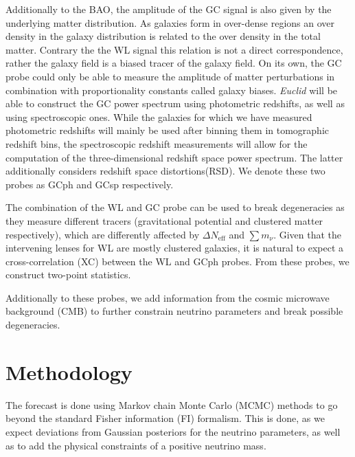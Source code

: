 \documentclass[a4paper,11pt]{article}
\newcommand{\euclid}{\textit{Euclid}\xspace}
\newcommand{\dneff}{\Delta N_\mathrm{eff}}
\newcommand{\summnu}{\sum m_\nu}
\begin{document}
Additionally to the BAO, the amplitude of the GC signal is also given by the underlying matter distribution. As galaxies form in over-dense regions an over density in the galaxy     distribution is related to the over density in the total matter. Contrary the the WL signal this relation is not a direct correspondence, rather the galaxy field is a biased tracer of the galaxy field. On its own, the GC probe could only be able to measure the amplitude of matter perturbations in combination with proportionality constants called galaxy biases. \euclid will be able to construct the GC power spectrum using photometric redshifts, as well as using spectroscopic ones. While the galaxies for which we have measured photometric redshifts will mainly be used after binning them in tomographic redshift bins, the spectroscopic redshift measurements will allow for the computation of the three-dimensional redshift space power spectrum. The latter additionally considers redshift space distortions(RSD). We denote these two probes as GCph and GCsp respectively.

The combination of the WL and GC probe can be used to break degeneracies as they measure different tracers (gravitational potential and clustered matter respectively), which are differently affected by $\dneff$ and $\summnu$. Given that the intervening lenses for WL are mostly clustered galaxies, it is natural to expect a cross-correlation (XC) between the WL and GCph probes. From these probes, we construct two-point statistics.

Additionally to these probes, we add information from the cosmic microwave background (CMB) to further constrain neutrino parameters and break possible degeneracies.

\section{Methodology}

The forecast is done using Markov chain Monte Carlo (MCMC) methods to go beyond the standard Fisher information (FI) formalism. This is done, as we expect deviations from Gaussian posteriors for the neutrino parameters, as well as to add the physical constraints of a positive neutrino mass.
\end{document}
